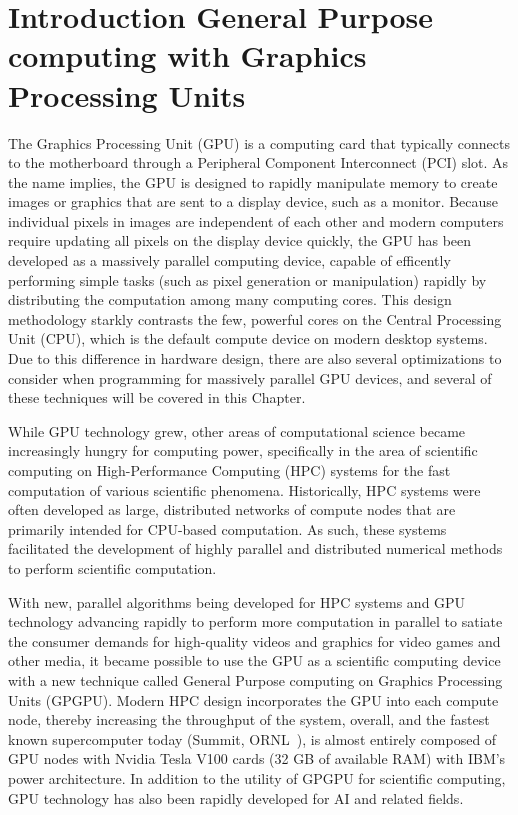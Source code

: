 \chapter{Introduction General Purpose computing with Graphics Processing Units}
\label{ch:gpu}

The Graphics Processing Unit (GPU) is a computing card that typically connects to the motherboard through a Peripheral Component Interconnect (PCI) slot.
As the name implies, the GPU is designed to rapidly manipulate memory to create images or graphics that are sent to a display device, such as a monitor.
Because individual pixels in images are independent of each other and modern computers require updating all pixels on the display device quickly, the GPU has been developed as a massively parallel computing device, capable of efficently performing simple tasks (such as pixel generation or manipulation) rapidly by distributing the computation among many computing cores.
This design methodology starkly contrasts the few, powerful cores on the Central Processing Unit (CPU), which is the default compute device on modern desktop systems.
Due to this difference in hardware design, there are also several optimizations to consider when programming for massively parallel GPU devices, and several of these techniques will be covered in this Chapter.

While GPU technology grew, other areas of computational science became increasingly hungry for computing power, specifically in the area of scientific computing on High-Performance Computing (HPC) systems for the fast computation of various scientific phenomena.
Historically, HPC systems were often developed as large, distributed networks of compute nodes that are primarily intended for CPU-based computation.
As such, these systems facilitated the development of highly parallel and distributed numerical methods to perform scientific computation.

With new, parallel algorithms being developed for HPC systems and GPU technology advancing rapidly to perform more computation in parallel to satiate the consumer demands for high-quality videos and graphics for video games and other media, it became possible to use the GPU as a scientific computing device with a new technique called General Purpose computing on Graphics Processing Units (GPGPU).
Modern HPC design incorporates the GPU into each compute node, thereby increasing the throughput of the system, overall, and the fastest known supercomputer today (Summit, ORNL~\cite{kahle2019}), is almost entirely composed of GPU nodes with Nvidia Tesla V100 cards (32 GB of available RAM) with IBM's power architecture.
In addition to the utility of GPGPU for scientific computing, GPU technology has also been rapidly developed for AI and related fields.

